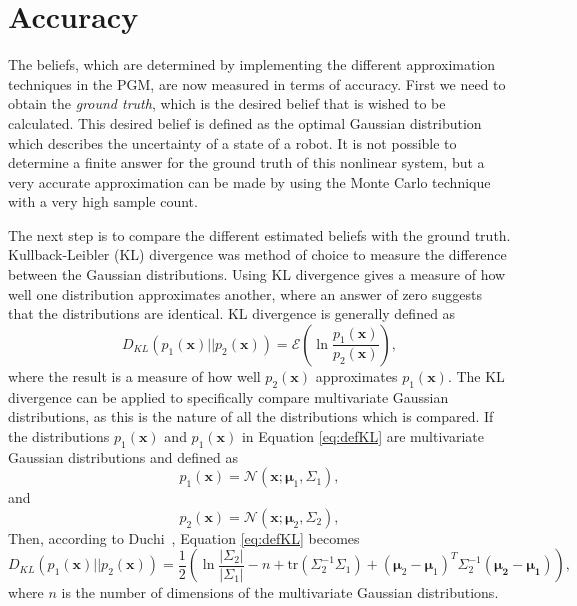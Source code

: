 \documentclass[12pt,oneside,openany,a4paper, %
afrikaans,english,
]{memoir}
\numberwithin{equation}{chapter}
\begin{document}
\section{Accuracy}
The beliefs, which are determined by implementing the different approximation techniques in the PGM, are now measured in terms of accuracy. First we need to obtain the \textit{ground truth}, which is the desired belief that is wished to be calculated. This desired belief is defined as the optimal Gaussian distribution which describes the uncertainty of a state of a robot. It is not possible to determine a finite answer for the ground truth of this nonlinear system, but a very accurate approximation can be made by using the Monte Carlo technique with a very high sample count.

The next step is to compare the different estimated beliefs with the ground truth. Kullback-Leibler (KL) divergence was method of choice to measure the difference between the Gaussian distributions. Using KL divergence gives a measure of how well one distribution approximates another, where an answer of zero suggests that the distributions are identical. KL divergence is generally defined as
\begin{equation}\label{eq:defKL}
D_{KL}(p_1(\bm{x})||p_2(\bm{x})) = \mathcal{E}\left(\ln\frac{p_1(\bm{x})}{p_2(\bm{x})}\right),
\end{equation}
where the result is a measure of how well $p_2(\bm{x})$ approximates $p_1(\bm{x})$.
The KL divergence can be applied to specifically compare multivariate Gaussian distributions, as this is the nature of all the distributions which is compared. If the distributions $p_1(\bm{x})$ and $p_1(\bm{x})$  in Equation \ref{eq:defKL} are multivariate Gaussian distributions and defined as
\begin{equation}
p_1(\bm{x})  = \mathcal{N}(\bm{x}; \bm{\mu}_1, \Sigma_1),
\end{equation}
and
\begin{equation}
p_2(\bm{x})  = \mathcal{N}(\bm{x}; \bm{\mu}_2, \Sigma_2),
\end{equation}
Then, according to Duchi~\cite{duchi}, Equation \ref{eq:defKL} becomes
\begin{equation}\label{eq:klGauss}
D_{KL}(p_1(\bm{x})||p_2(\bm{x}))= \frac{1}{2}\left(\ln\frac{|\Sigma_2|}{|\Sigma_1|} - n + \text{tr}\left(\Sigma_2^{-1}\Sigma_1\right) + (\bm{\mu}_2 - \bm{\mu}_1)^T \Sigma_2^{-1} (\bm{\mu_2}-\bm{\mu_1})\right),
\end{equation}
where $n$ is the number of dimensions of the multivariate Gaussian distributions.
\end{document}
